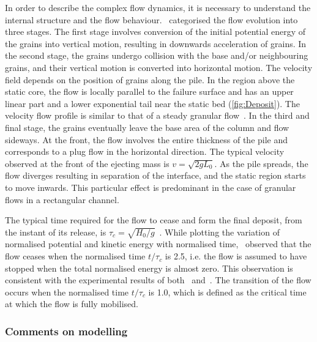 In order to describe the complex flow dynamics, it is necessary to understand 
the internal structure and the flow behaviour.~\citep{Staron2007a} categorised 
the flow evolution into three stages. 
The first stage involves conversion of the initial potential energy of the 
grains into vertical motion, resulting in downwards acceleration of grains. In 
the second stage, the grains undergo collision with the base and/or 
neighbouring grains, and their vertical motion is converted into horizontal 
motion. The velocity field depends on the position of grains along the 
pile. In the region above the static core, the 
flow is locally parallel to the failure surface and has an upper linear part 
and a lower exponential tail near the static bed (\cref{fig:Deposit}). The 
velocity flow profile is similar to that of a steady granular 
flow~\citep{Midi2004}. In the third and final 
stage, the grains eventually leave the base area of the column and flow 
sideways. At the 
front, the flow involves the entire thickness of the pile and corresponds to a 
plug flow in the horizontal direction. The typical 
velocity observed at the front of the ejecting mass is 
$\textit{v}=\sqrt{2\textit{g}\textit{L}_{\textit{0}}}$. As the pile spreads, 
the flow diverges resulting in separation of the interface, and the static 
region starts to move inwards. This particular effect is 
predominant in the case of granular flows in a rectangular channel. 

The typical time required for the flow to cease and form the final 
deposit, from the instant of its release, is 
$\tau_c=\sqrt{\textit{H}_{\textit{0}}/\textit{g}}$~\citep{Staron2007a}. 
While plotting the variation of normalised potential and kinetic energy with 
normalised time,~\citet{Staron2007a} observed that the flow ceases when the 
normalised time $\textit{t}/\tau_c$ is 2.5, i.e. the flow is assumed to 
have stopped when the total normalised energy is almost zero. This observation 
is consistent with the experimental results of both~\citet{Lube2005} 
and~\citet{Lajeunesse2005}. The transition of the flow occurs when the 
normalised time $\textit{t}/\tau_c$ is 1.0, which is defined as the critical 
time at which the flow is fully mobilised.

\subsubsection{Comments on modelling}

